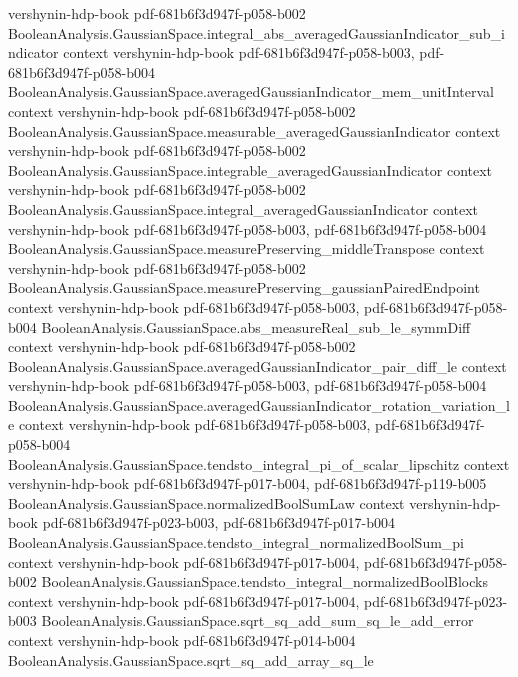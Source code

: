 \begin{theorem}
  {vershynin-hdp-book}
  {pdf-681b6f3d947f-p058-b002}
\proofstep
  {BooleanAnalysis.GaussianSpace.integral_abs_averagedGaussianIndicator_sub_indicator}
  {context}
  {vershynin-hdp-book}
  {pdf-681b6f3d947f-p058-b003,
    pdf-681b6f3d947f-p058-b004}
\proofstep
  {BooleanAnalysis.GaussianSpace.averagedGaussianIndicator_mem_unitInterval}
  {context}
  {vershynin-hdp-book}
  {pdf-681b6f3d947f-p058-b002}
\proofstep
  {BooleanAnalysis.GaussianSpace.measurable_averagedGaussianIndicator}
  {context}
  {vershynin-hdp-book}
  {pdf-681b6f3d947f-p058-b002}
\proofstep
  {BooleanAnalysis.GaussianSpace.integrable_averagedGaussianIndicator}
  {context}
  {vershynin-hdp-book}
  {pdf-681b6f3d947f-p058-b002}
\proofstep
  {BooleanAnalysis.GaussianSpace.integral_averagedGaussianIndicator}
  {context}
  {vershynin-hdp-book}
  {pdf-681b6f3d947f-p058-b003,
    pdf-681b6f3d947f-p058-b004}
\proofstep
  {BooleanAnalysis.GaussianSpace.measurePreserving_middleTranspose}
  {context}
  {vershynin-hdp-book}
  {pdf-681b6f3d947f-p058-b002}
\proofstep
  {BooleanAnalysis.GaussianSpace.measurePreserving_gaussianPairedEndpoint}
  {context}
  {vershynin-hdp-book}
  {pdf-681b6f3d947f-p058-b003,
    pdf-681b6f3d947f-p058-b004}
\proofstep
  {BooleanAnalysis.GaussianSpace.abs_measureReal_sub_le_symmDiff}
  {context}
  {vershynin-hdp-book}
  {pdf-681b6f3d947f-p058-b002}
\proofstep
  {BooleanAnalysis.GaussianSpace.averagedGaussianIndicator_pair_diff_le}
  {context}
  {vershynin-hdp-book}
  {pdf-681b6f3d947f-p058-b003,
    pdf-681b6f3d947f-p058-b004}
\proofstep
  {BooleanAnalysis.GaussianSpace.averagedGaussianIndicator_rotation_variation_le}
  {context}
  {vershynin-hdp-book}
  {pdf-681b6f3d947f-p058-b003,
    pdf-681b6f3d947f-p058-b004}
\proofstep
  {BooleanAnalysis.GaussianSpace.tendsto_integral_pi_of_scalar_lipschitz}
  {context}
  {vershynin-hdp-book}
  {pdf-681b6f3d947f-p017-b004,
    pdf-681b6f3d947f-p119-b005}
\proofstep
  {BooleanAnalysis.GaussianSpace.normalizedBoolSumLaw}
  {context}
  {vershynin-hdp-book}
  {pdf-681b6f3d947f-p023-b003,
    pdf-681b6f3d947f-p017-b004}
\proofstep
  {BooleanAnalysis.GaussianSpace.tendsto_integral_normalizedBoolSum_pi}
  {context}
  {vershynin-hdp-book}
  {pdf-681b6f3d947f-p017-b004,
    pdf-681b6f3d947f-p058-b002}
\proofstep
  {BooleanAnalysis.GaussianSpace.tendsto_integral_normalizedBoolBlocks}
  {context}
  {vershynin-hdp-book}
  {pdf-681b6f3d947f-p017-b004,
    pdf-681b6f3d947f-p023-b003}
\proofstep
  {BooleanAnalysis.GaussianSpace.sqrt_sq_add_sum_sq_le_add_error}
  {context}
  {vershynin-hdp-book}
  {pdf-681b6f3d947f-p014-b004}
\proofstep
  {BooleanAnalysis.GaussianSpace.sqrt_sq_add_array_sq_le}

\end{theorem}
